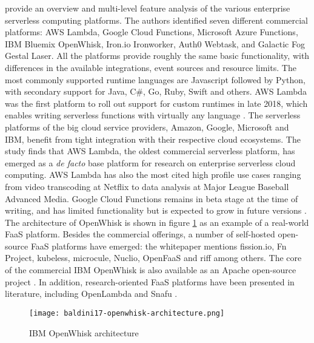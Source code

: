 \textcite{lynn2017preliminary} provide an overview and multi-level feature analysis of the various enterprise serverless computing platforms. The authors identified seven different commercial platforms: AWS Lambda, Google Cloud Functions, Microsoft Azure Functions, IBM Bluemix OpenWhisk, Iron.io Ironworker, Auth0 Webtask, and Galactic Fog Gestal Laser. All the platforms provide roughly the same basic functionality, with differences in the available integrations, event sources and resource limits. The most commonly supported runtime languages are Javascript followed by Python, with secondary support for Java, C\#, Go, Ruby, Swift and others. AWS Lambda was the first platform to roll out support for custom runtimes in late 2018, which enables writing serverless functions with virtually any language \parencite{awslambda0218}. The serverless platforms of the big cloud service providers, Amazon, Google, Microsoft and IBM, benefit from tight integration with their respective cloud ecosystems. The study finds that AWS Lambda, the oldest commercial serverless platform, has emerged as a \textit{de facto} base platform for research on enterprise serverless cloud computing. AWS Lambda has also the most cited high profile use cases ranging from video transcoding at Netflix to data analysis at Major League Baseball Advanced Media. Google Cloud Functions remains in beta stage at the time of writing, and has limited functionality but is expected to grow in future versions \parencite{google18cloudFunctions}. The architecture of OpenWhisk is shown in figure \ref{fig:openwhisk} as an example of a real-world FaaS platform. Besides the commercial offerings, a number of self-hosted open-source FaaS platforms have emerged: the \textcite{cncf18serverlessWG} whitepaper mentions fission.io, Fn Project, kubeless, microcule, Nuclio, OpenFaaS and riff among others. The core of the commercial IBM OpenWhisk is also available as an Apache open-source project \parencite{ibm18cloudFunctions}. In addition, research-oriented FaaS platforms have been presented in literature, including OpenLambda \parencite{hendrickson16openlambda} and Snafu \parencite{spillner17snafu}.

\begin{figure}[h]
  \centering
  \texttt{[image: baldini17-openwhisk-architecture.png]}
  \caption{IBM OpenWhisk architecture \parencite{baldini17currentTrends}}
  \label{fig:openwhisk}
\end{figure}

